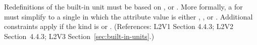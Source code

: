 Redefinitions of the built-in unit  must be based on
,  or .  More formally, a
\UnitDefinition for  must simplify to a single \Unit in which
the  attribute value is either , , or
.  Additional constraints apply if the kind is
 or .    (References: L2V1 Section 4.4.3; L2V2
Section~4.4.3; L2V3 Section~\ref{sec:built-in-units}.)
